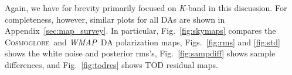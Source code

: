 \documentclass[twocolumn]{../../common/aa}
\def\WMAP{\emph{WMAP}}
\newcommand{\cosmoglobe}{\textsc{Cosmoglobe}}
\newcommand{\K}[0]{\textit K}
\newcommand{\Q}[0]{\textit Q}
\newcommand{\data}{\vec d}
\begin{document}
Again, we have for brevity primarily focused on \K-band in this discussion. For completeness, however, similar plots for all DAs are shown in Appendix~\ref{sec:map_survey}. In particular, Fig.~\ref{fig:skymaps} compares the \cosmoglobe\ and \WMAP\ DA polarization maps, Figs.~\ref{fig:rms} and \ref{fig:std} shows the white noise and posterior rms's, Fig.~\ref{fig:sampdiff} shows sample differences, and Fig.~\ref{fig:todres} shows TOD residual maps.








\end{document}
